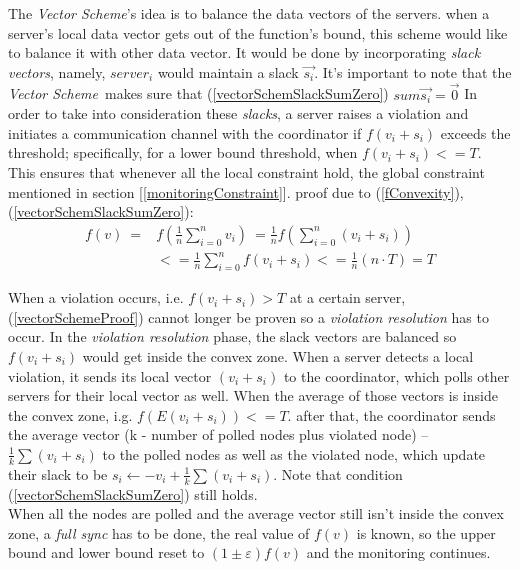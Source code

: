 \documentclass[10pt,a4paper]{article}
\newcommand{\vecScheme}{\textit{Vector Scheme}}
\begin{document}
\begin{multicols*}{2}
The \vecScheme 's idea is to balance the data vectors of the servers. when a server's local data vector gets out of the function's bound, this scheme would like to balance it with other data vector. It would be done by incorporating \textit{slack vectors}, namely, $server_i$ would maintain a slack $\overrightarrow{s_i}$. It's important to note that the \vecScheme \  makes sure that (\label{vectorSchemSlackSumZero}\ref{vectorSchemSlackSumZero}) $sum{\overrightarrow{s_i}} = \textstyle \overrightarrow{0}$
In order to take into consideration these \textit{slacks}, a server raises a violation and initiates a communication channel with the coordinator if $f(v_i+s_i)$ exceeds the threshold; specifically, for a lower bound threshold, when $f(v_i+s_i) <= T$. This ensures that whenever all the local constraint hold, the global constraint mentioned in section [\ref{monitoringConstraint}]. proof due to (\ref{fConvexity}), (\ref{vectorSchemSlackSumZero}):
\begin{equation}
\label{vectorSchemeProof}
\begin{aligned}
 f(v)  \
	   ={} & f\left(\frac{1}{n} \sum\limits_{i=0}^{n}{v_i}\right)  \
        =   \frac{1}{n} f\left(\sum\limits_{i=0}^{n}{(v_i + s_i)}\right) \\
     & <=   \frac{1}{n} \sum\limits_{i=0}^{n}{f(v_i + s_i)}
       <=   \frac{1}{n}(n \cdot T)
       = T
\end{aligned}
\end{equation}

When a violation occurs, i.e. $f(v_i+s_i)>T$ at a certain server, (\ref{vectorSchemeProof}) cannot longer be proven so a \textit{violation resolution} has to occur. In the \textit{violation resolution} phase, the slack vectors are balanced so $f(v_i+s_i)$ would get inside the convex zone. When a server detects a local violation, it sends its local vector $(v_i + s_i)$ to the coordinator, which polls other servers for their local vector as well. When the average of those vectors is inside the convex zone, i.g. $f(E(v_i + s_i)) <= T$. after that, the coordinator sends the average vector (k - number of polled nodes plus violated node) -- $\frac{1}{k}\sum{(v_i + s_i)}$ to the polled nodes as well as the violated node, which update their slack to be $s_i \leftarrow -v_i + \frac{1}{k}\sum{(v_i + s_i)} $. Note that condition (\ref{vectorSchemSlackSumZero}) still holds. \\
When all the nodes are polled and the average vector still isn't inside the convex zone, a \textit{full sync} has to be done, the real value of $f(v)$ is known, so the upper bound and lower bound reset to $(1 \pm \varepsilon )f(v)$ and the monitoring continues.


\end{multicols*}
\end{document}
